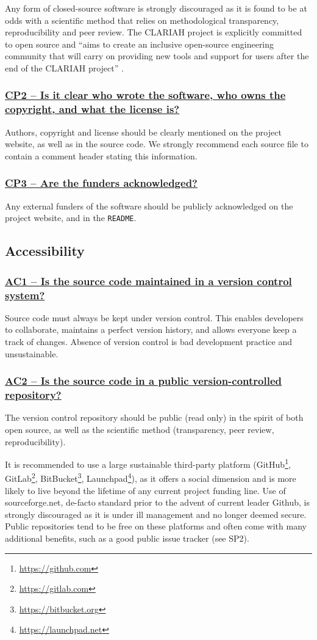\documentclass[a4paper,11pt]{article}
\newcommand{\indicator}[1]{\subsubsection*{\underline{#1}}}
\begin{document}
Any form of closed-source software is strongly discouraged as it is found to be
at odds with a scientific method that relies on methodological transparency,
reproducibility and peer review. The CLARIAH project is explicitly committed to
open source and ``aims to create an inclusive open-source engineering community
that will carry on providing new tools and support for users after the end of
the CLARIAH project'' \citep{CLARIAHTECHPLAN1}.


\indicator{CP2 -- Is it clear who wrote the software, who owns the
copyright, and what the license is?}

Authors, copyright and license should be clearly mentioned on the project
website, as well as in the source code.  We strongly recommend each source file
to contain a comment header stating this information.

\indicator{CP3 -- Are the funders acknowledged?}

Any external funders of the software should be publicly acknowledged on the project
website, and in the \texttt{README}.

\subsection{Accessibility}

\indicator{AC1 -- Is the source code maintained in a version control system?}

Source code must always be kept under version control. This enables developers
to collaborate, maintains a perfect version history, and allows everyone keep a
track of changes. Absence of version control is bad development practice and
unsustainable.

\indicator{AC2 -- Is the source code in a public version-controlled repository?}

The version control repository should be public (read only) in the spirit of both open
source, as well as the scientific method (transparency, peer review,
reproducibility). 

It is recommended to use a large sustainable third-party platform
(GitHub\footnote{\url{https://github.com}},
GitLab\footnote{\url{https://gitlab.com}},
BitBucket\footnote{\url{https://bitbucket.org}},
Launchpad\footnote{\url{https://launchpad.net}}), as it offers a social
dimension and is more likely to live beyond the lifetime of any current project
funding line. Use of sourceforge.net, de-facto standard prior to the advent of
current leader Github, is strongly discouraged as it is under ill management
and no longer deemed secure. Public repositories tend to be free on these platforms and
often come with many additional benefits, such as a good public issue tracker
(see SP2).
\end{document}
